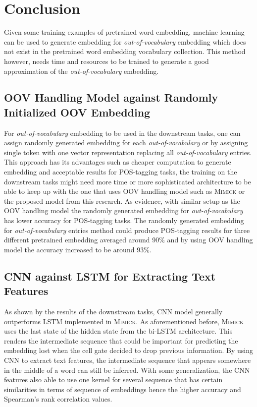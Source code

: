 \chapter{Conclusion}
\label{chap:conc}

Given some training examples of pretrained word embedding, machine
learning can be used to generate embedding for
\textit{out-of-vocabulary} embedding which does not exist in the
pretrained word embedding vocabulary collection. This method however,
needs time and resources to be trained to generate a good
approximation of the \textit{out-of-vocabulary} embedding.

\section{OOV Handling Model against Randomly Initialized OOV Embedding}
For \textit{out-of-vocabulary} embedding to be used in the downstream
tasks, one can assign randomly generated embedding for each
\textit{out-of-vocabulary} or by assigning single token with one
vector representation replacing all \textit{out-of-vocabulary}
entries. This approach has its advantages such as cheaper computation
to generate embedding and acceptable results for POS-tagging tasks,
the training on the downstream tasks might need more time or more
sophisticated architecture to be able to keep up with the one that
uses OOV handling model such as \textsc{Mimick} or the proposed model
from this research. As evidence, with similar setup as the OOV
handling model the randomly generated embedding for
\textit{out-of-vocabulary} has lower accuracy for POS-tagging tasks.
The randomly generated embedding for \textit{out-of-vocabulary}
entries method could produce POS-tagging results for three different
pretrained embedding averaged around 90\% and by using OOV handling
model the accuracy increased to be around 93\%.

\section{CNN against LSTM for Extracting Text Features}
As shown by the results of the downstream tasks, CNN model generally
outperforms LSTM implemented in \textsc{Mimick}. As aforementioned
before, \textsc{Mimick} uses the last state of the hidden state from
the bi-LSTM architecture. This renders the intermediate sequence that
could be important for predicting the embedding lost when the cell
gate decided to drop previous information. By using CNN to extract
text features, the intermediate sequence that appears somewhere in the
middle of a word can still be inferred. With some generalization, the
CNN features also able to use one kernel for several sequence that has
certain similarities in terms of sequence of embeddings hence the
higher accuracy and Spearman's rank correlation values.

